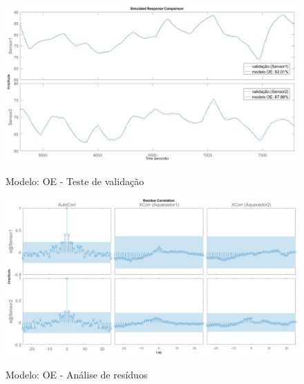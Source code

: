 \begin{figure}[h]
	\caption{Modelo: OE - Teste de validação}
	\begin{center}
		\includegraphics[width=1.00\textwidth]{./5_images/tclabsp-models-OE-compare.png} 
		\label{fig:tclabsp-models-oe-compare}
	\end{center}
	\centering
\end{figure}

\begin{figure}[h]
	\caption{Modelo: OE - Análise de resíduos}
	\begin{center}
		\includegraphics[width=1.00\textwidth]{./5_images/tclabsp-models-OE-resid.png} 
		\label{fig:tclabsp-models-oe-resid}
	\end{center}
	\centering
\end{figure}

